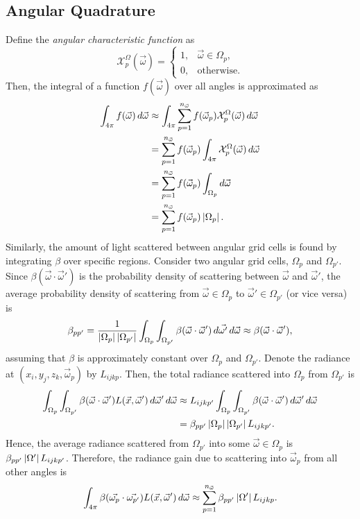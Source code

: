 \subsection{Angular Quadrature}
Define the \textit{angular characteristic function} as
\begin{equation*}
  \mathcal{X}^\Omega_p(\vec{\omega}) = \begin{cases}
    1, & \vec{\omega} \in \Omega_p, \\
    0, & \mbox{otherwise}.
  \end{cases}
\end{equation*}
Then, the integral of a function $f(\vec{\omega})$ over all angles is approximated as
\begin{align*}
  \int_{4\pi} f(\vec{\omega})\, d\vec{\omega} &\approx \int_{4\pi} \sum_{p=1}^{n_{\vec{\omega}}} f(\vec{\omega}_p) \mathcal{X}^\Omega_p(\vec{\omega})\, d\vec{\omega} \\
  &= \sum_{p=1}^{n_{\vec{\omega}}} f(\vec{\omega}_p) \int_{4\pi} \mathcal{X}^\Omega_p(\vec{\omega})\, d\vec{\omega} \\
  &= \sum_{p=1}^{n_{\vec{\omega}}} f(\vec{\omega}_p) \int_{\Omega_p} d\vec{\omega} \\
  &= \sum_{p=1}^{n_{\vec{\omega}}} f(\vec{\omega}_p) \left| \Omega_p \right|.
\end{align*}
Similarly, the amount of light scattered between angular grid cells is found by integrating $\beta$ over specific regions.
Consider two angular grid cells, $\Omega_p$ and $\Omega_{p'}$.
Since $\beta(\vec{\omega}\cdot\vec{\omega}')$ is the probability density of scattering between $\vec{\omega}$ and $\vec{\omega}'$, the average probability density of scattering from $\vec{\omega} \in \Omega_p$ to $\vec{\omega}' \in \Omega_{p'}$ (or vice versa) is
\begin{equation*}
  \beta_{pp'} = \frac{1}{\left| \Omega_p \right|\left| \Omega_{p'} \right|} \int_{\Omega_p}\int_{\Omega_{p'}}\beta(\vec{\omega}\cdot\vec{\omega}')\, d\vec{\omega'}\, d\vec{\omega} \approx \beta(\vec{\omega}\cdot\vec{\omega}'),
\end{equation*}
assuming that $\beta$ is approximately constant over $\Omega_p$ and $\Omega_{p'}$.
Denote the radiance at $(x_i, y_j, z_k, \vec{\omega}_p)$ by $L_{ijkp}$.
Then, the total radiance scattered into $\Omega_p$ from $\Omega_{p'}$ is
\begin{align*}
  \int_{\Omega_p}\int_{\Omega_{p'}}\beta(\vec{\omega} \cdot \vec{\omega}')L(\vec{x},\vec{\omega}')\, d\vec{\omega}'\, d\vec{\omega}
  &\approx L_{ijkp'} \int_{\Omega_p}\int_{\Omega_{p'}} \beta(\vec{\omega} \cdot \vec{\omega}')\, d\vec{\omega}'\, d\vec{\omega} \\
  &= \beta_{pp'}\left| \Omega_p \right|\left| \Omega_{p'} \right|L_{ijkp'}.
\end{align*}
Hence, the average radiance scattered from $\Omega_{p'}$ into some $\vec{\omega} \in \Omega_p$ is $\beta_{pp'}\left| \Omega' \right|L_{ijkp'}$.
Therefore, the radiance gain due to scattering into $\vec{\omega}_p$ from all other angles is
\begin{equation}
  \int_{4\pi}\beta(\vec{\omega_p}\cdot\vec{\omega_{p'}})L(\vec{x}, \vec{\omega}')\, d\vec{\omega} \approx \sum_{p=1}^{n_{\vec{\omega}}} \beta_{pp'}\left| \Omega' \right|L_{ijkp}.
  \label{eqn:scatter_integral}
\end{equation}

